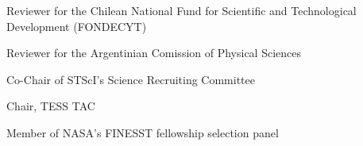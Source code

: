 \documentclass[12pt, a4paper]{article} %
\begin{document}
\begin{minipage}[t]{0.7\textwidth}
\begin{flushleft}%
  \setlength{\leftskip}{0.2cm}%
Reviewer for the Chilean National Fund for Scientific and Technological Development (FONDECYT)
\end{flushleft}
\end{minipage}
\begin{minipage}[t]{0.3\textwidth}
\end{minipage}


\vspace{0.2cm}

\begin{minipage}[t]{0.7\textwidth}
\begin{flushleft}%
  \setlength{\leftskip}{0.2cm}%
Reviewer for the Argentinian Comission of Physical Sciences
\end{flushleft}
\end{minipage}
\begin{minipage}[t]{0.3\textwidth}
\end{minipage}

\vspace{0.2cm}

\begin{minipage}[t]{0.7\textwidth}
\begin{flushleft}%
  \setlength{\leftskip}{0.2cm}%
Co-Chair of STScI's Science Recruiting Committee
\end{flushleft}
\end{minipage}
\begin{minipage}[t]{0.3\textwidth}
\hfill 
\end{minipage}

\vspace{0.2cm}

\begin{minipage}[t]{0.7\textwidth}
\begin{flushleft}%
  \setlength{\leftskip}{0.2cm}%
Chair, TESS TAC
\end{flushleft}
\end{minipage}
\begin{minipage}[t]{0.3\textwidth}
\hfill 
\end{minipage}

\vspace{0.2cm}

\begin{minipage}[t]{0.7\textwidth}
\begin{flushleft}%
  \setlength{\leftskip}{0.2cm}%
Member of NASA's FINESST fellowship selection panel
\end{flushleft}
\end{minipage}
\begin{minipage}[t]{0.3\textwidth}
\hfill 
\end{minipage}
\end{document}

